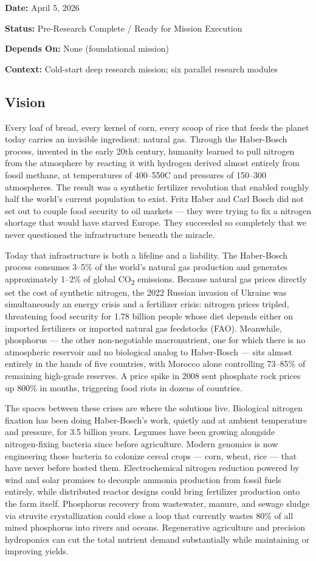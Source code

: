 \documentclass[11pt,letterpaper]{article}
\newcommand{\metafield}[2]{\textbf{\sffamily #1} #2\par}
\begin{document}
\metafield{Date:}{April 5, 2026}
\metafield{Status:}{Pre-Research Complete / Ready for Mission Execution}
\metafield{Depends On:}{None (foundational mission)}
\metafield{Context:}{Cold-start deep research mission; six parallel research modules}

\subsection{Vision}

Every loaf of bread, every kernel of corn, every scoop of rice that feeds the planet today carries an invisible ingredient: natural gas. Through the Haber-Bosch process, invented in the early 20th century, humanity learned to pull nitrogen from the atmosphere by reacting it with hydrogen derived almost entirely from fossil methane, at temperatures of 400--550\textdegree C and pressures of 150--300 atmospheres. The result was a synthetic fertilizer revolution that enabled roughly half the world's current population to exist. Fritz Haber and Carl Bosch did not set out to couple food security to oil markets --- they were trying to fix a nitrogen shortage that would have starved Europe. They succeeded so completely that we never questioned the infrastructure beneath the miracle.

Today that infrastructure is both a lifeline and a liability. The Haber-Bosch process consumes 3--5\% of the world's natural gas production and generates approximately 1--2\% of global CO\textsubscript{2} emissions. Because natural gas prices directly set the cost of synthetic nitrogen, the 2022 Russian invasion of Ukraine was simultaneously an energy crisis and a fertilizer crisis: nitrogen prices tripled, threatening food security for 1.78 billion people whose diet depends either on imported fertilizers or imported natural gas feedstocks (FAO). Meanwhile, phosphorus --- the other non-negotiable macronutrient, one for which there is no atmospheric reservoir and no biological analog to Haber-Bosch --- sits almost entirely in the hands of five countries, with Morocco alone controlling 73--85\% of remaining high-grade reserves. A price spike in 2008 sent phosphate rock prices up 800\% in months, triggering food riots in dozens of countries.

The spaces between these crises are where the solutions live. Biological nitrogen fixation has been doing Haber-Bosch's work, quietly and at ambient temperature and pressure, for 3.5 billion years. Legumes have been growing alongside nitrogen-fixing bacteria since before agriculture. Modern genomics is now engineering those bacteria to colonize cereal crops --- corn, wheat, rice --- that have never before hosted them. Electrochemical nitrogen reduction powered by wind and solar promises to decouple ammonia production from fossil fuels entirely, while distributed reactor designs could bring fertilizer production onto the farm itself. Phosphorus recovery from wastewater, manure, and sewage sludge via struvite crystallization could close a loop that currently wastes 80\% of all mined phosphorus into rivers and oceans. Regenerative agriculture and precision hydroponics can cut the total nutrient demand substantially while maintaining or improving yields.
\end{document}
